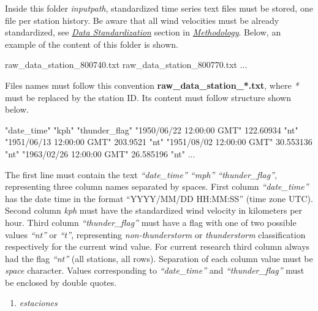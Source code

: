 \documentclass[12pt,oneside]{reedthesis}
\newenvironment{Shaded}{\begin{snugshade}}{\end{snugshade}}
\newcommand{\ExtensionTok}[1]{#1}
\newcommand{\StringTok}[1]{\textcolor[rgb]{0.31,0.60,0.02}{#1}}
\providecommand{\tightlist}{%
  \setlength{\itemsep}{0pt}\setlength{\parskip}{0pt}}
\begin{document}
Inside this folder \emph{inputpath}, standardized time series text files must be stored, one file per station history. Be aware that all wind velocities must be already standardized, see \emph{\protect\hyperlink{rmd-standardization}{Data Standardization}} section in \emph{\protect\hyperlink{rmd-method}{Methodology}}. Below, an example of the content of this folder is shown.

\scriptsize

\vspace{0.4cm}
\begin{Shaded}
\begin{Highlighting}[]
      \ExtensionTok{raw_data_station_800740.txt}
      \ExtensionTok{raw_data_station_800770.txt}
      \ExtensionTok{...}
\end{Highlighting}
\end{Shaded}
\normalsize

Files names must follow this convention \textbf{raw\_data\_station\_*.txt}, where \emph{*} must be replaced by the station ID. Its content must follow structure shown below.

\scriptsize

\vspace{0.4cm}
\begin{Shaded}
\begin{Highlighting}[]
      \StringTok{"date_time"} \StringTok{"kph"} \StringTok{"thunder_flag"}
      \StringTok{"1950/06/22 12:00:00 GMT"}  \ExtensionTok{122.60934} \StringTok{"nt"}
      \StringTok{"1951/06/13 12:00:00 GMT"}   \ExtensionTok{203.9521} \StringTok{"nt"}
      \StringTok{"1951/08/02 12:00:00 GMT"}  \ExtensionTok{30.553136} \StringTok{"nt"}
      \StringTok{"1963/02/26 12:00:00 GMT"}  \ExtensionTok{26.585196} \StringTok{"nt"}
      \ExtensionTok{...}
\end{Highlighting}
\end{Shaded}
\normalsize

The first line must contain the text \emph{``date\_time'' ``mph'' ``thunder\_flag''}, representing three column names separated by spaces. First column \emph{``date\_time''} has the date time in the format ``YYYY/MM/DD HH:MM:SS'' (time zone UTC). Second column \emph{kph} must have the standardized wind velocity in kilometers per hour. Third column \emph{``thunder\_flag''} must have a flag with one of two possible values \emph{``nt''} or \emph{``t''}, representing \emph{non-thunderstorm} or \emph{thunderstorm} classification respectively for the current wind value. For current research third column always had the flag \emph{``nt''} (all stations, all rows). Separation of each column value must be \emph{space} character. Values corresponding to \emph{``date\_time''} and \emph{``thunder\_flag''} must be enclosed by double quotes.
\begin{enumerate}
\def\labelenumi{\arabic{enumi}.}
\setcounter{enumi}{1}
\tightlist
\item
  \emph{estaciones}
\end{enumerate}
\scriptsize
\end{document}
